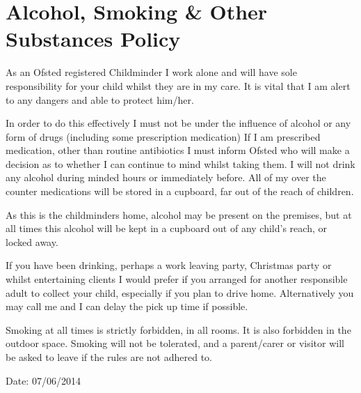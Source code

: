 
\section{Alcohol, Smoking \& Other Substances Policy}

As an Ofsted registered Childminder I work alone and will have sole
responsibility for your child whilst they are in my care. It is vital
that I am alert to any dangers and able to protect him/her.

In order to do this effectively I must not be under the influence of
alcohol or any form of drugs (including some prescription medication) If
I am prescribed medication, other than routine antibiotics I must inform
Ofsted who will make a decision as to whether I can continue to mind
whilst taking them. I will not drink any alcohol during minded hours or
immediately before. All of my over the counter medications will be
stored in a cupboard, far out of the reach of children.

As this is the childminders home, alcohol may be present on the
premises, but at all times this alcohol will be kept in a cupboard out
of any child's reach, or locked away.

If you have been drinking, perhaps a work leaving party, Christmas party
or whilst entertaining clients I would prefer if you arranged for
another responsible adult to collect your child, especially if you plan
to drive home. Alternatively you may call me and I can delay the pick up
time if possible.

Smoking at all times is strictly forbidden, in all rooms. It is also
forbidden in the outdoor space. Smoking will not be tolerated, and a
parent/carer or visitor will be asked to leave if the rules are not
adhered to.

Date: 07/06/2014


